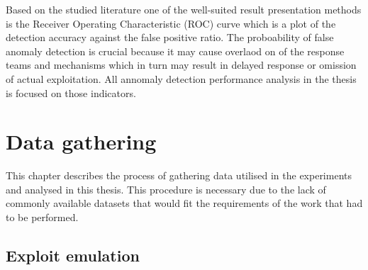\documentclass[a4paper,twoside,12pt]{book}
\begin{document}
Based on the studied literature one of the well-suited result presentation methods is the Receiver 
Operating Characteristic (ROC) curve which is a plot of the detection accuracy against the false 
positive ratio. The proboability of false anomaly detection is crucial because it may cause overlaod
on of the response teams and mechanisms which in turn may result in delayed response or omission
of actual exploitation. All annomaly detection performance analysis in the thesis is focused
on those indicators. 


\chapter{Data gathering}

This chapter describes the process of gathering data utilised in the experiments and 
analysed in this thesis. This procedure is necessary due to the lack of commonly available 
datasets that would fit the requirements of the work that had to be performed. 

\section{Exploit emulation}
\end{document}
